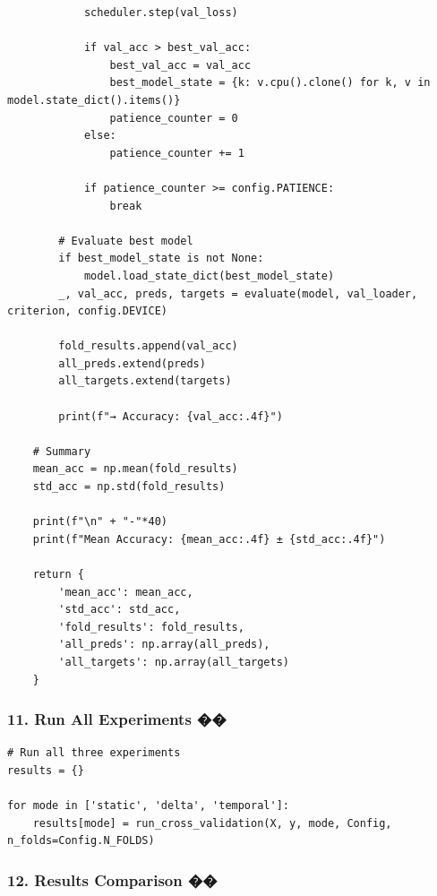 \begin{lstlisting}
            scheduler.step(val_loss)
 
            if val_acc > best_val_acc:
                best_val_acc = val_acc
                best_model_state = {k: v.cpu().clone() for k, v in model.state_dict().items()}
                patience_counter = 0
            else:
                patience_counter += 1
 
            if patience_counter >= config.PATIENCE:
                break
 
        # Evaluate best model
        if best_model_state is not None:
            model.load_state_dict(best_model_state)
        _, val_acc, preds, targets = evaluate(model, val_loader, criterion, config.DEVICE)
 
        fold_results.append(val_acc)
        all_preds.extend(preds)
        all_targets.extend(targets)
 
        print(f"→ Accuracy: {val_acc:.4f}")
 
    # Summary
    mean_acc = np.mean(fold_results)
    std_acc = np.std(fold_results)
 
    print(f"\n" + "-"*40)
    print(f"Mean Accuracy: {mean_acc:.4f} ± {std_acc:.4f}")
 
    return {
        'mean_acc': mean_acc,
        'std_acc': std_acc,
        'fold_results': fold_results,
        'all_preds': np.array(all_preds),
        'all_targets': np.array(all_targets)
    }
\end{lstlisting}
 
\subsubsection*{11. Run All Experiments ��}
 
\begin{lstlisting}
# Run all three experiments
results = {}
 
for mode in ['static', 'delta', 'temporal']:
    results[mode] = run_cross_validation(X, y, mode, Config, n_folds=Config.N_FOLDS)
\end{lstlisting}
 
\subsubsection*{12. Results Comparison ��}
 
